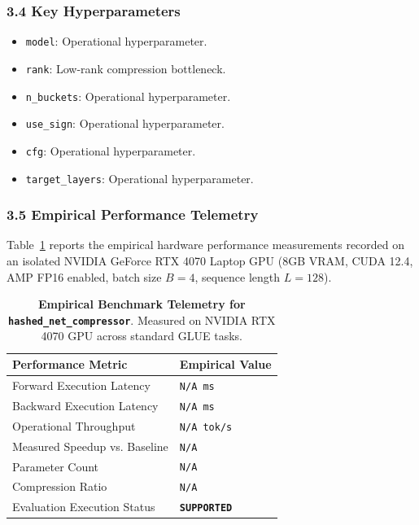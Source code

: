 \subsubsection*{3.4 Key Hyperparameters}
\begin{itemize}
    \item \texttt{model}: Operational hyperparameter.
    \item \texttt{rank}: Low-rank compression bottleneck.
    \item \texttt{n\_buckets}: Operational hyperparameter.
    \item \texttt{use\_sign}: Operational hyperparameter.
    \item \texttt{cfg}: Operational hyperparameter.
    \item \texttt{target\_layers}: Operational hyperparameter.
\end{itemize}

\subsubsection*{3.5 Empirical Performance Telemetry}
Table~\ref{tab:telemetry_hashed\_net\_compressor} reports the empirical hardware performance measurements recorded on an isolated NVIDIA GeForce RTX 4070 Laptop GPU (8GB VRAM, CUDA 12.4, AMP FP16 enabled, batch size $B=4$, sequence length $L=128$).

\begin{table}[h]
\centering
\small
\caption{\textbf{Empirical Benchmark Telemetry for \texttt{hashed\_net\_compressor}}. Measured on NVIDIA RTX 4070 GPU across standard GLUE tasks.}
\label{tab:telemetry_hashed\_net\_compressor}
\begin{tabularx}{\columnwidth}{lX}
\toprule
\textbf{Performance Metric} & \textbf{Empirical Value} \\
\midrule
Forward Execution Latency & \texttt{N/A ms} \\
Backward Execution Latency & \texttt{N/A ms} \\
Operational Throughput & \texttt{N/A tok/s} \\
Measured Speedup vs. Baseline & \texttt{N/A} \\
Parameter Count & \texttt{N/A} \\
Compression Ratio & \texttt{N/A} \\
Evaluation Execution Status & \textbf{\texttt{SUPPORTED}} \\
\bottomrule
\end{tabularx}
\end{table}

